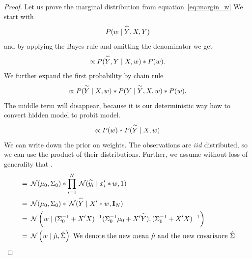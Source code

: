 \begin{proof}
Let us prove the marginal distribution from equation~\ref{eq:margin_w} 
We start with
\begin{equation}
    P(w \mid \overset{\sim}{Y}, X, Y) 
\end{equation}
and by applying the Bayes rule and omitting the denominator we get
\begin{equation}
    \propto   P(\overset{\sim}{Y}, Y \mid X, w) * P(w).
\end{equation}
We further expand the first probability by chain rule
\begin{equation}
    \propto   P(\overset{\sim}{Y} \mid X, w) * P(Y \mid \overset{\sim}{Y},  X, w) * P(w).
\end{equation}
The middle term will disappear, because it is our deterministic way how to convert hidden model to probit model.
\begin{equation}
    \propto   P(w) * P(\overset{\sim}{Y} \mid X, w)
\end{equation}
We can write down the prior on weights. The observations are $iid$ distributed, so we can use the product of their distributions. Further, we assume without loss of generality that .
\begin{align}
    &= \:\mathcal{N}(\mu_0, \Sigma_0) * \prod_{i=1}^N \:\mathcal{N}(\overset{\sim}{y_i} \mid x_i' * w, 1) \\
    &= \:\mathcal{N}(\mu_0, \Sigma_0) * \:\mathcal{N}(\overset{\sim}{Y} \mid X' * w, \mathbf{I}_N) \label{eq:w_marg_vect}\\
    &= \:\mathcal{N} \left(w  \mid  (\Sigma_0^{-1} + X'X)^{-1}(\Sigma_0^{-1}\mu_0 + X'\overset{\sim}{Y}), (\Sigma_0^{-1} + X'X)^{-1}\right) \label{eq:w_marg_final} \\
    &= \:\mathcal{N} \left(w  \mid  \hat{\mu}, \hat{\Sigma}\right)  \text{ We denote the new mean $\hat{\mu}$ and the new covariance $\hat{\Sigma}$}
\end{align}


\end{proof}
